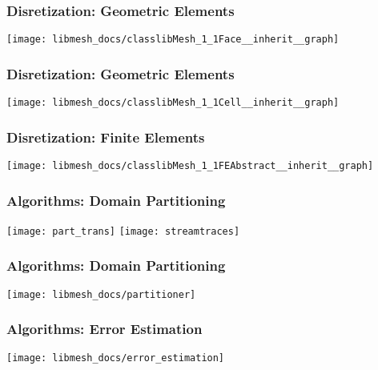 \frame
{
  \frametitle{Disretization: Geometric Elements}
  \begin{center}
    \texttt{[image: libmesh\_docs/classlibMesh\_1\_1Face\_\_inherit\_\_graph]}
  \end{center}
}      



\frame
{
  \frametitle{Disretization: Geometric Elements}
  \begin{center}
    \texttt{[image: libmesh\_docs/classlibMesh\_1\_1Cell\_\_inherit\_\_graph]}
  \end{center}
}      



\frame
{
  \frametitle{Disretization: Finite Elements}
  \begin{center}
    \texttt{[image: libmesh\_docs/classlibMesh\_1\_1FEAbstract\_\_inherit\_\_graph]}
  \end{center}
}      



\frame
{
  \frametitle{Algorithms: Domain Partitioning}
  \begin{center}
    \texttt{[image: part\_trans]}
    \texttt{[image: streamtraces]}
  \end{center}  
}



\frame
{
  \frametitle{Algorithms: Domain Partitioning}
  \begin{center}
    \texttt{[image: libmesh\_docs/partitioner]}
  \end{center}
}


\frame
{
  \frametitle{Algorithms: Error Estimation}
  \begin{center}
    \texttt{[image: libmesh\_docs/error\_estimation]}
  \end{center}
}





